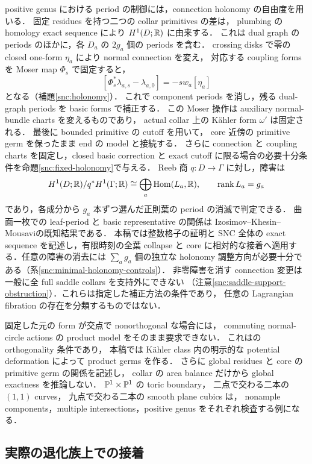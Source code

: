 positive genus における period の制御には，connection holonomy の自由度を用いる．
固定 residues を持つ二つの collar primitives の差は，
plumbing の homology exact sequence により $H^1(D;\mathbb R)$ に由来する．
これは dual graph の periods のほかに，各 $D_a$ の $2g_a$ 個の periods を含む．
crossing disks で零の closed one-form $\eta_a$ により normal connection を変え，
対応する coupling forms を Moser map $\Phi_s$ で固定すると，
\[
 [\Phi_s^*\lambda_{a,s}-\lambda_{a,0}]
       =-s w_a[\eta_a]
\]
となる（補題\ref{snc:holonomy}）．
これで component periods を消し，残る dual-graph periods を basic forms で補正する．
この Moser 操作は auxiliary normal-bundle charts を変えるものであり，
actual collar 上の Kähler form $\omega'$ は固定される．
最後に bounded primitive の cutoff を用いて，
core 近傍の primitive germ を保ったまま end の model と接続する．
さらに connection と coupling charts を固定し，closed basic correction と exact cutoff
に限る場合の必要十分条件を命題\ref{snc:fixed-holonomy}で与える．
Reeb 商 $q:D\to\Gamma$ に対し，障害は
\[
 H^1(D;\mathbb R)/q^*H^1(\Gamma;\mathbb R)
 \cong\bigoplus_a\operatorname{Hom}(L_a,\mathbb R),\qquad
 \operatorname{rank}L_a=g_a
\]
であり，各成分から $g_a$ 本ずつ選んだ正則葉の period の消滅で判定できる．
曲面一枚での leaf-period と basic representative の関係は
Izosimov--Khesin--Mousavi\cite[Lemma 4.8, \S5]{IKM}の既知結果である．
本稿では整数格子の証明と SNC 全体の exact sequence を記述し，有限時刻の全葉 collapse と
core に相対的な接着へ適用する．任意の障害の消去には $\sum_a g_a$ 個の独立な holonomy
調整方向が必要十分である（系\ref{snc:minimal-holonomy-controls}）．
非零障害を消す connection 変更は一般に全 full saddle collars を支持外にできない
（注意\ref{snc:saddle-support-obstruction}）．これらは指定した補正方法の条件であり，
任意の Lagrangian fibration の存在を分類するものではない．

固定した元の form が交点で nonorthogonal な場合には，
commuting normal-circle actions の product model をそのまま要求できない．
これは\cite[Proposition 2.5]{BSV}の orthogonality 条件であり，
本稿では Kähler class 内の明示的な potential deformation によって product germs を作る．
さらに global residues と core の primitive germ の関係を記述し，
collar の area balance だけから global exactness を推論しない．
$\mathbb P^1\times\mathbb P^1$ の toric boundary，
二点で交わる二本の $(1,1)$ curves，
九点で交わる二本の smooth plane cubics は，
nonample components，multiple intersections，positive genus をそれぞれ検査する例になる．

\subsection{実際の退化族上での接着}

